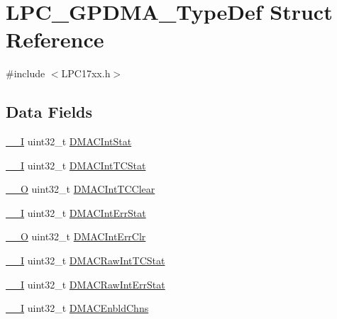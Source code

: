 \hypertarget{structLPC__GPDMA__TypeDef}{}\section{L\+P\+C\+\_\+\+G\+P\+D\+M\+A\+\_\+\+Type\+Def Struct Reference}
\label{structLPC__GPDMA__TypeDef}


{\ttfamily \#include $<$L\+P\+C17xx.\+h$>$}

\subsection*{Data Fields}
\begin{DoxyCompactItemize}
\item 
\hyperlink{LPC17xx_8h_af63697ed9952cc71e1225efe205f6cd3}{\+\_\+\+\_\+I} uint32\+\_\+t \hyperlink{structLPC__GPDMA__TypeDef_ab976615c894b59f210d94ab761ffca71}{D\+M\+A\+C\+Int\+Stat}
\item 
\hyperlink{LPC17xx_8h_af63697ed9952cc71e1225efe205f6cd3}{\+\_\+\+\_\+I} uint32\+\_\+t \hyperlink{structLPC__GPDMA__TypeDef_a19097c01fd1d71e54cf60ce9859f15ef}{D\+M\+A\+C\+Int\+T\+C\+Stat}
\item 
\hyperlink{LPC17xx_8h_a7e25d9380f9ef903923964322e71f2f6}{\+\_\+\+\_\+O} uint32\+\_\+t \hyperlink{structLPC__GPDMA__TypeDef_adc6f2f63a0452ac0b1c9ea7f73c8db0a}{D\+M\+A\+C\+Int\+T\+C\+Clear}
\item 
\hyperlink{LPC17xx_8h_af63697ed9952cc71e1225efe205f6cd3}{\+\_\+\+\_\+I} uint32\+\_\+t \hyperlink{structLPC__GPDMA__TypeDef_a8ff4967e332b4f4255fdae5d202240c7}{D\+M\+A\+C\+Int\+Err\+Stat}
\item 
\hyperlink{LPC17xx_8h_a7e25d9380f9ef903923964322e71f2f6}{\+\_\+\+\_\+O} uint32\+\_\+t \hyperlink{structLPC__GPDMA__TypeDef_af854927900770fc5687d2c42c20994b5}{D\+M\+A\+C\+Int\+Err\+Clr}
\item 
\hyperlink{LPC17xx_8h_af63697ed9952cc71e1225efe205f6cd3}{\+\_\+\+\_\+I} uint32\+\_\+t \hyperlink{structLPC__GPDMA__TypeDef_a8b4b633d2bf304b6e985e58631b961ec}{D\+M\+A\+C\+Raw\+Int\+T\+C\+Stat}
\item 
\hyperlink{LPC17xx_8h_af63697ed9952cc71e1225efe205f6cd3}{\+\_\+\+\_\+I} uint32\+\_\+t \hyperlink{structLPC__GPDMA__TypeDef_ac2a28d16be18132ba46d8392689e6206}{D\+M\+A\+C\+Raw\+Int\+Err\+Stat}
\item 
\hyperlink{LPC17xx_8h_af63697ed9952cc71e1225efe205f6cd3}{\+\_\+\+\_\+I} uint32\+\_\+t \hyperlink{structLPC__GPDMA__TypeDef_a2fb2c9c1b0cc0f7b833820690de9793a}{D\+M\+A\+C\+Enbld\+Chns}

\end{DoxyCompactItemize}
